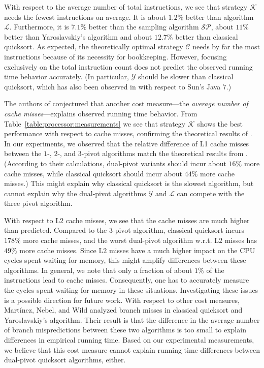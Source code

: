 \documentclass[prodmode,acmtalg]{acmsmall}
\begin{document}
With respect to the average number of total instructions, we see that strategy
$\mathcal{K}$ needs the fewest instructions on average. It is about $1.2\%$ better
than algorithm $\mathcal{L}$. Furthermore, it is $7.1\%$ better
than the sampling algorithm $\mathcal{SP}$, about $11\%$ better than Yaroslavskiy's
algorithm and about $12.7\%$ better than classical quicksort. 
As expected, the theoretically optimal strategy
$\mathcal{C}$ needs by far the most instructions because of its necessity for
bookkeeping. However, focusing exclusively on
the total instruction count does not predict the observed running time behavior
accurately. (In particular, $\mathcal{Y}$ should be slower than classical quicksort,
which has also been observed in
\cite{nebel13} with respect to Sun's Java 7.)

The authors of \cite{Kushagra14} conjectured that another cost measure---the
\emph{average number of cache misses}---explains observed running time behavior.
From Table~\ref{table:processor:measurements} we see that strategy $\mathcal{K}$
shows the best performance with respect to cache misses, confirming the
theoretical results of \cite{Kushagra14}. In our experiments, we observed that
the relative difference of L1 cache misses between the $1$-, $2$-, and $3$-pivot
algorithms match the theoretical results from \cite{Kushagra14}.  (According to
their calculations, dual-pivot variants should incur about $16\%$ more cache
misses, while classical quicksort should incur about $44\%$ more cache misses.)
This might explain why classical quicksort is the slowest algorithm, but cannot
explain why the dual-pivot algorithms $\mathcal{Y}$ and $\mathcal{L}$ can
compete with the three pivot algorithm.

With respect 
to L$2$ cache misses, we see that the cache misses are much higher than predicted.
Compared to the $3$-pivot algorithm, classical quicksort incurs $178\%$ more
cache misses, and the worst dual-pivot algorithm w.r.t. L$2$ misses has $49\%$ more
cache misses. Since L$2$ misses have a much higher impact on the CPU cycles
spent waiting for memory, this might amplify differences between these algorithms.
In general, we note that only a fraction of about $1\%$ of the instructions lead to cache
misses. Consequently, one has to accurately measure the cycles spent waiting
for memory in these situations. Investigating these issues
is a  possible direction for future work. With respect to other cost measures,
Mart\'inez, Nebel, and Wild \cite{MartinezNW15} analyzed branch misses in classical quicksort and 
Yaroslavskiy's algorithm. Their result is that the difference in the average number of branch mispredictions
between these two algorithms is too small to explain differences in empirical running time.  
Based on our experimental measurements, we believe that 
this cost measure cannot explain running time differences between dual-pivot quicksort algorithms, either. 
\end{document}
